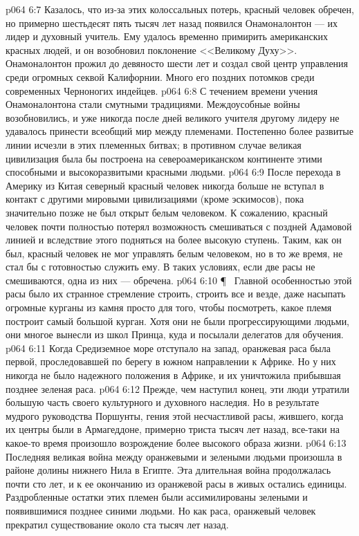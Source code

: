 \vs p064 6:7 Казалось, что из\hyp{}за этих колоссальных потерь, красный человек обречен, но примерно шестьдесят пять тысяч лет назад появился Онамоналонтон --- их лидер и духовный учитель. Ему удалось временно примирить американских красных людей, и он возобновил поклонение <<Великому Духу>>. Онамоналонтон прожил до девяносто шести лет и создал свой центр управления среди огромных секвой Калифорнии. Много его поздних потомков среди современных Черноногих индейцев.
\vs p064 6:8 С течением времени учения Онамоналонтона стали смутными традициями. Междоусобные войны возобновились, и уже никогда после дней великого учителя другому лидеру не удавалось принести всеобщий мир между племенами. Постепенно более развитые линии исчезли в этих племенных битвах; в противном случае великая цивилизация была бы построена на североамериканском континенте этими способными и высокоразвитыми красными людьми.
\vs p064 6:9 После перехода в Америку из Китая северный красный человек никогда больше не вступал в контакт с другими мировыми цивилизациями (кроме эскимосов), пока значительно позже не был открыт белым человеком. К сожалению, красный человек почти полностью потерял возможность смешиваться с поздней Адамовой линией и вследствие этого подняться на более высокую ступень. Таким, как он был, красный человек не мог управлять белым человеком, но в то же время, не стал бы с готовностью служить ему. В таких условиях, если две расы не смешиваются, одна из них --- обречена.
\vs p064 6:10 \P\ \bibnobreakspace {} Главной особенностью этой расы было их странное стремление строить, строить все и везде, даже насыпать огромные курганы из камня просто для того, чтобы посмотреть, какое племя построит самый большой курган. Хотя они не были прогрессирующими людьми, они многое вынесли из школ Принца, куда и посылали делегатов для обучения.
\vs p064 6:11 Когда Средиземное море отступало на запад, оранжевая раса была первой, проследовавшей по берегу в южном направлении к Африке. Но у них никогда не было надежного положения в Африке, и их уничтожила прибывшая позднее зеленая раса.
\vs p064 6:12 Прежде, чем наступил конец, эти люди утратили большую часть своего культурного и духовного наследия. Но в результате мудрого руководства Поршунты, гения этой несчастливой расы, жившего, когда их центры были в Армагеддоне, примерно триста тысяч лет назад, все\hyp{}таки на какое\hyp{}то время произошло возрождение более высокого образа жизни.
\vs p064 6:13 Последняя великая война между оранжевыми и зелеными людьми произошла в районе долины нижнего Нила в Египте. Эта длительная война продолжалась почти сто лет, и к ее окончанию из оранжевой расы в живых остались единицы. Раздробленные остатки этих племен были ассимилированы зелеными и появившимися позднее синими людьми. Но как раса, оранжевый человек прекратил существование около ста тысяч лет назад.
